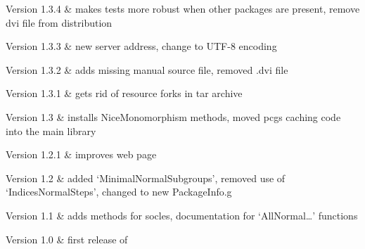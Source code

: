 Version 1.3.4 & 
	makes tests more robust when other packages are present, remove dvi file from distribution
	
Version 1.3.3 &	
	new server address, change to UTF-8 encoding
	
Version 1.3.2 &
	adds missing manual source file, removed .dvi file
	
Version 1.3.1 & 
	gets rid of resource forks in tar archive
	
Version 1.3	&
	installs NiceMonomorphism methods, moved pcgs caching code into the main {\GAP} library
	
Version 1.2.1	&
	improves web page
	
Version 1.2	&
	added `MinimalNormalSubgroups', removed use of `IndicesNormalSteps', changed to new PackageInfo.g 

Version 1.1 	& 
	adds methods for socles, documentation for `AllNormal\dots' functions
	
Version 1.0	&
	first release of {\CRISP}
	
\enditems

